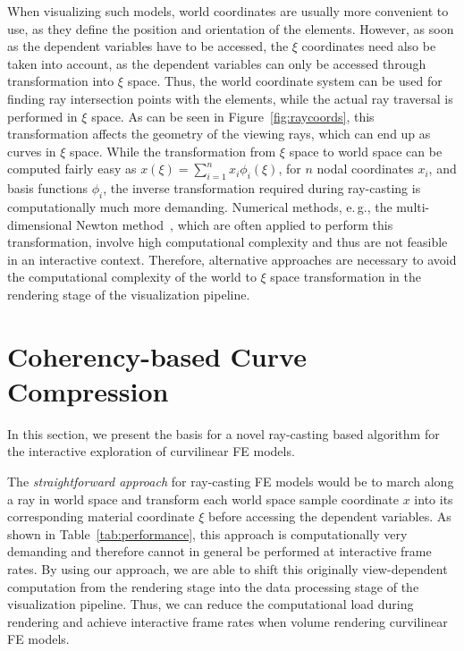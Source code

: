 \documentclass[journal]{vgtc}                %
\begin{document}
When visualizing such models, world coordinates are usually more convenient to use, as they define the position and orientation of the elements. However, as soon as the dependent variables have to be accessed, the $\xi$ coordinates need also be taken into account, as the dependent variables can only be accessed through transformation into $\xi$ space. Thus, the world coordinate system can be used for finding ray intersection points with the elements, while the actual ray traversal is performed in $\xi$ space. As can be seen in Figure~\ref{fig:raycoords}, this transformation affects the geometry of the viewing rays, which can end up as curves in $\xi$ space. While the transformation from $\xi$ space to world space can be computed fairly easy as $x(\xi)=\sum_{i=1}^n x_i \phi_i(\xi)$, for $n$ nodal coordinates $x_i$, and basis functions $\phi_i$, the inverse transformation required during ray-casting is computationally much more demanding. Numerical methods, e.\,g., the multi-dimensional Newton method~\cite{Press92}, which are often applied to perform this transformation, involve high computational complexity and thus are not feasible in an interactive context. Therefore, alternative approaches are necessary to avoid the computational complexity of the world to $\xi$ space transformation in the rendering stage of the visualization pipeline.
%
%
%
\section{Coherency-based Curve Compression}\label{sec:preprocessing}
In this section, we present the basis for a novel ray-casting based algorithm for the interactive exploration of curvilinear FE models.

The \emph{straightforward approach} for ray-casting FE models would be to march along a ray in world space and transform each world space sample coordinate $x$ into its corresponding material coordinate $\xi$ before accessing the dependent variables. As shown in Table~\ref{tab:performance}, this approach is computationally very demanding and therefore cannot in general be performed at interactive frame rates. By using our approach, we are able to shift this originally view-dependent computation from the rendering stage into the data processing stage of the visualization pipeline. Thus, we can reduce the computational load during rendering and achieve interactive frame rates when volume rendering curvilinear FE models.
\end{document}
